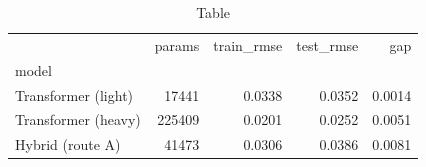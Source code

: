\begin{table}
\caption{Table}
\label{tab:table}
\begin{tabular}{lrrrr}
\toprule
 & params & train\_rmse & test\_rmse & gap \\
model &  &  &  &  \\
\midrule
Transformer (light) & 17441 & 0.0338 & 0.0352 & 0.0014 \\
Transformer (heavy) & 225409 & 0.0201 & 0.0252 & 0.0051 \\
Hybrid (route A) & 41473 & 0.0306 & 0.0386 & 0.0081 \\
\bottomrule
\end{tabular}
\end{table}
